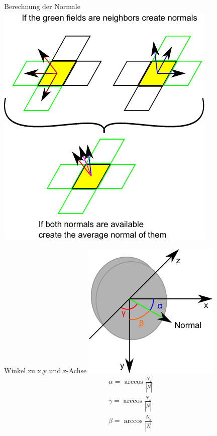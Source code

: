 \documentclass{VLKlauck}
\begin{document}
\begin{frame}{Berechnung der Normale}
{\begin{gather}
		\end{gather}
	}
	\includegraphics[scale=0.5]{normals.pdf}
	\end{frame}
	   
	\begin{frame}{Winkel zu x,y und z-Achse}
		  \includegraphics[scale=0.9]{Angles.pdf}
		\begin{align}
		 \alpha = \arccos \frac{N_x}{\left|\vec{N}\right|}  
		\nonumber\\
		 \gamma = \arccos \frac{N_z}{\left|\vec{N}\right|}  
		\nonumber\\
		 \beta  = \arccos \frac{N_y}{\left|\vec{N}\right|}  
		\nonumber
		\end{align} 
	
	\end{frame}
	
	
	
\end{document}
